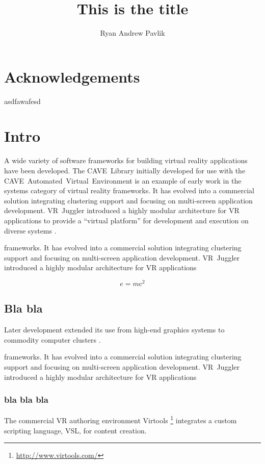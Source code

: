 \documentclass[capstoc,capschap,draftcls]{rpisudiss}
\title{This is the title}
\author{Ryan Andrew Pavlik}
\begin{document}
\maketitle %

\tableofcontents{}
\listoffigures
\listoftables

\chapter{Acknowledgements}
asdfawafesd

\mainmatter %

\chapter{Intro}


A wide variety of software frameworks for building virtual reality
applications have been developed. The CAVE~Library initially developed
for use with the CAVE~Automated~Virtual~Environment \cite{Cruz-Neira1993}
is an example of early work in the systems category of virtual reality
frameworks. It has evolved into a commercial solution integrating
clustering support and focusing on multi-screen application development.
VR~Juggler introduced a highly modular architecture for VR applications
to provide a ``virtual platform'' for development and execution
on diverse systems \cite{Bierbaum2001,Bierbaum2005}.

frameworks. It has evolved into a commercial solution integrating
clustering support and focusing on multi-screen application development.
VR~Juggler introduced a highly modular architecture for VR applications

\[e=m\mathrm{c}^2\]

\section{Bla bla}
Later development
extended its use from high-end graphics systems to commodity computer
clusters \cite{Allard2002,Bierbaum2005}.


frameworks. It has evolved into a commercial solution integrating
clustering support and focusing on multi-screen application development.
VR~Juggler introduced a highly modular architecture for VR applications

\subsection{bla bla bla}
The commercial
VR authoring environment Virtools%
\footnote{\url{http://www.virtools.com/}%
} integrates a custom scripting language, VSL, for content creation.
\end{document}
